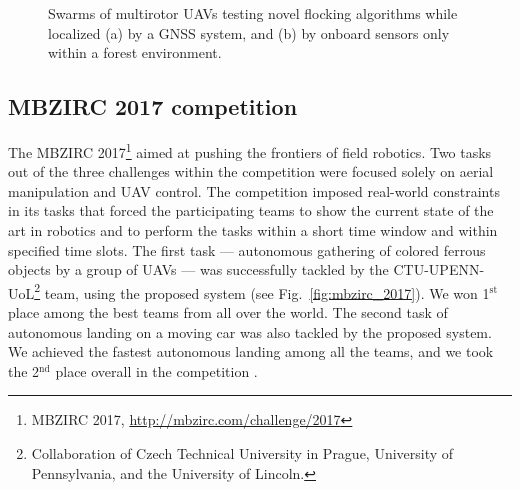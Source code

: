 \documentclass[a4paper,11pt,titlepage,twoside]{book}
\newcommand{\reffig}[1]{Fig.~\ref{#1}}
\begin{document}
\begin{figure}
{}
    \caption{Swarms of multirotor \acp{UAV} testing novel flocking algorithms while localized (a) by a \ac{GNSS} system, and (b) by onboard sensors only within a forest environment.}
    \label{fig:swarms}
  \end{figure}


  \subsection{MBZIRC 2017 competition}

  The \ac{MBZIRC} 2017\footnote{MBZIRC 2017, \url{http://mbzirc.com/challenge/2017}} aimed at pushing the frontiers of field robotics.
  Two tasks out of the three challenges within the competition were focused solely on aerial manipulation and UAV control.
  The competition imposed real-world constraints in its tasks that forced the participating teams to show the current state of the art in robotics and to perform the tasks within a short time window and within specified time slots.
  The first task --- autonomous gathering of colored ferrous objects by a group of \acp{UAV} --- was successfully tackled by the CTU-UPENN-UoL\footnote{Collaboration of Czech Technical University in Prague, University of Pennsylvania, and the University of Lincoln.} team, using the proposed system \cite{spurny2019cooperative, faigl2019unsupervised, loianno2018localization} (see \reffig{fig:mbzirc_2017}).
  We won 1$^{\mathrm{st}}$ place among the best teams from all over the world.
  The second task of autonomous landing on a moving car was also tackled by the proposed system.
  We achieved the fastest autonomous landing among all the teams, and we took the 2$^{\text{nd}}$ place overall in the competition \cite{baca2019autonomous, stepan2019vision}.
\end{document}
